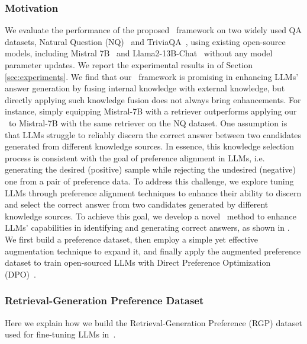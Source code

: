 \subsubsection{\textbf{Motivation}}
We evaluate the performance of the proposed \framework~framework on two widely used QA datasets, Natural Question (NQ)~\cite{kwiatkowski2019natural} and TriviaQA~\cite{joshi2017triviaqa}, using existing open-source models, including Mistral 7B~\cite{jiang2023mistral7b} and Llama2-13B-Chat~\cite{touvron2023llama2openfoundation} without any model parameter updates. 
We report the experimental results in  of Section \ref{sec:experiments}.
We find that our \framework~framework is promising in enhancing LLMs' answer generation by fusing internal knowledge with external knowledge, but directly applying such knowledge fusion does not always bring enhancements. 
For instance, simply equipping Mistral-7B with a retriever outperforms applying our \framework~to Mistral-7B with the same retriever on the NQ dataset. 
One assumption is that LLMs struggle to reliably discern the correct answer between two candidates generated from different knowledge sources.
In essence, this knowledge selection process is consistent with the goal of preference alignment in LLMs, i.e. generating the desired (positive) sample while rejecting the undesired (negative) one from a pair of preference data.
To address this challenge, we explore tuning LLMs through preference alignment techniques to enhance their ability to discern and select the correct answer from two candidates generated by different knowledge sources.
To achieve this goal, we develop a novel \approach~method to enhance LLMs' capabilities in identifying and generating correct answers, as shown in .
We first build a preference dataset, then employ a simple yet effective augmentation technique to expand it, and finally apply the augmented preference dataset to train open-sourced LLMs with Direct Preference Optimization (DPO)~\cite{Rafailov2023DPO}. 

\subsubsection{\textbf{Retrieval-Generation Preference Dataset}}
Here we explain how we build the Retrieval-Generation Preference (RGP) dataset used for fine-tuning LLMs in~\approach.

